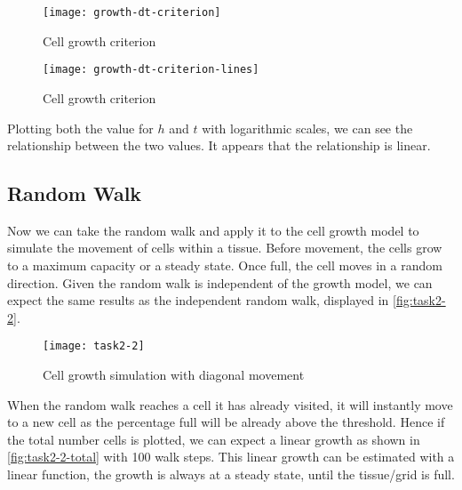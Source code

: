 
\begin{figure}[ht]
    \centering
    \texttt{[image: growth-dt-criterion]}
    \caption[Cell growth criterion]{Cell growth criterion}
    \label{fig:growth-dt-criterion}
\end{figure}

\begin{figure}[ht]
    \centering
    \texttt{[image: growth-dt-criterion-lines]}
    \caption[Cell growth criterion]{Cell growth criterion}
    \label{fig:growth-dt-criterion-lines}
\end{figure}

Plotting both the value for $h$ and $t$ with logarithmic scales, we can see the relationship between the two values.
It appears that the relationship is linear.

\clearpage

\subsection{Random Walk}

Now we can take the random walk and apply it to the cell growth model to simulate the movement of cells within a tissue.
Before movement, the cells grow to a maximum capacity or a steady state. Once full, the cell moves in a random direction.
Given the random walk is independent of the growth model, we can expect the same results as the independent random walk, displayed in \autoref{fig:task2-2}.

\begin{figure}[ht]
    \centering
    \texttt{[image: task2-2]}
    \caption[Cell growth simulation with diagonal movement]{Cell growth simulation with diagonal movement}
    \label{fig:task2-2}
\end{figure}

When the random walk reaches a cell it has already visited, it will instantly move to a new cell as the percentage full will be already above the threshold.
Hence if the total number cells is plotted, we can expect a linear growth as shown in \autoref{fig:task2-2-total} with 100 walk steps.
This linear growth can be estimated with a linear function, the growth is always at a steady state, until the tissue/grid is full.



